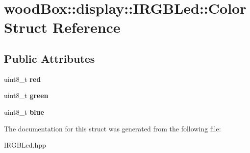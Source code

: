 \hypertarget{structwood_box_1_1display_1_1_i_r_g_b_led_1_1_color}{}\section{wood\+Box\+:\+:display\+:\+:I\+R\+G\+B\+Led\+:\+:Color Struct Reference}
\label{structwood_box_1_1display_1_1_i_r_g_b_led_1_1_color}
\subsection*{Public Attributes}
\begin{DoxyCompactItemize}
\item 
\mbox{\label{structwood_box_1_1display_1_1_i_r_g_b_led_1_1_color_a7cad735ecd61e533c62646c72867fee3}} 
uint8\+\_\+t {\bfseries red}
\item 
\mbox{\label{structwood_box_1_1display_1_1_i_r_g_b_led_1_1_color_a9e501824bc452e0808fcda6ab26b0174}} 
uint8\+\_\+t {\bfseries green}
\item 
\mbox{\label{structwood_box_1_1display_1_1_i_r_g_b_led_1_1_color_a57baec8ec405f072b8393699b6d9de1d}} 
uint8\+\_\+t {\bfseries blue}
\end{DoxyCompactItemize}


The documentation for this struct was generated from the following file\+:\begin{DoxyCompactItemize}
\item 
I\+R\+G\+B\+Led.\+hpp\end{DoxyCompactItemize}
